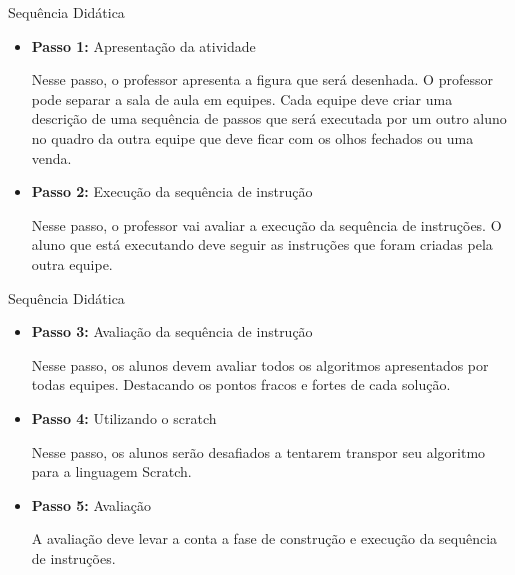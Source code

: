 \documentclass{beamer}
\begin{document}
\begin{frame}{Sequência Didática}

\begin{itemize}
\item \textbf{Passo 1:} Apresentação da atividade

Nesse passo, o professor apresenta a figura que será desenhada. O professor pode separar a sala de aula em equipes. Cada equipe deve criar uma descrição de uma sequência de passos que será executada por um outro aluno no quadro da outra equipe  que deve ficar com os olhos fechados ou uma venda. 

\item \textbf{Passo 2:} Execução da sequência de instrução

Nesse passo, o professor vai avaliar a execução da sequência de instruções. O aluno que está executando deve seguir as instruções que foram criadas pela outra equipe. 


\end{itemize}
    
\end{frame}


\begin{frame}{Sequência Didática}

\begin{itemize}
    \item \textbf{Passo 3:} Avaliação da sequência de instrução

Nesse passo, os alunos devem avaliar todos os algoritmos apresentados por todas equipes. Destacando os pontos fracos e fortes de cada solução.


\item \textbf{Passo 4:} Utilizando o scratch

Nesse passo, os alunos serão desafiados a tentarem transpor seu algoritmo para a linguagem Scratch.

\item \textbf{Passo 5:} Avaliação

A avaliação deve levar a conta a fase de construção e execução da sequência de instruções.

\end{itemize}    
    
\end{frame}



\end{document}

